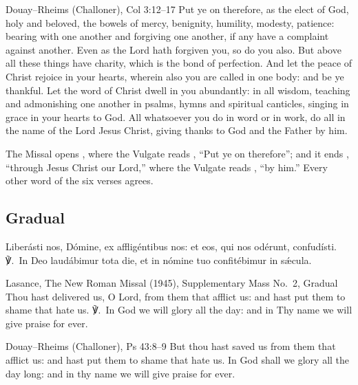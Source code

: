 \begin{englishwitness}{Douay--Rheims (Challoner), Col 3:12--17}
Put ye on therefore, as the elect of God, holy and beloved, the bowels of
mercy, benignity, humility, modesty, patience: bearing with one another and
forgiving one another, if any have a complaint against another. Even as the
Lord hath forgiven you, so do you also. But above all these things have
charity, which is the bond of perfection. And let the peace of Christ rejoice
in your hearts, wherein also you are called in one body: and be ye thankful.
Let the word of Christ dwell in you abundantly: in all wisdom, teaching and
admonishing one another in psalms, hymns and spiritual canticles, singing in
grace in your hearts to God. All whatsoever you do in word or in work, do all
in the name of the Lord Jesus Christ, giving thanks to God and the Father by
him.
\end{englishwitness}

\noindent The Missal opens , where the
Vulgate reads , ``Put ye on therefore''; and
it ends , ``through Jesus Christ our
Lord,'' where the Vulgate reads , ``by him.'' Every other
word of the six verses agrees.

\subsection{Gradual}
\label{proper-gradual}


\begin{latinproper}
Liberásti nos, Dómine, ex affligéntibus nos: et eos, qui nos odérunt,
confudísti. ℣.~In Deo laudábimur tota die, et in nómine tuo confitébimur in
sǽcula.
\end{latinproper}

\begin{englishwitness}{Lasance, The New Roman Missal (1945), Supplementary Mass No.~2, Gradual}
Thou hast delivered us, O Lord, from them that afflict us: and hast put them
to shame that hate us. ℣.~In God we will glory all the day: and in Thy name we
will give praise for ever.
\end{englishwitness}

\begin{englishwitness}{Douay--Rheims (Challoner), Ps 43:8--9}
But thou hast saved us from them that afflict us: and hast put them to shame
that hate us. In God shall we glory all the day long: and in thy name we will
give praise for ever.
\end{englishwitness}

